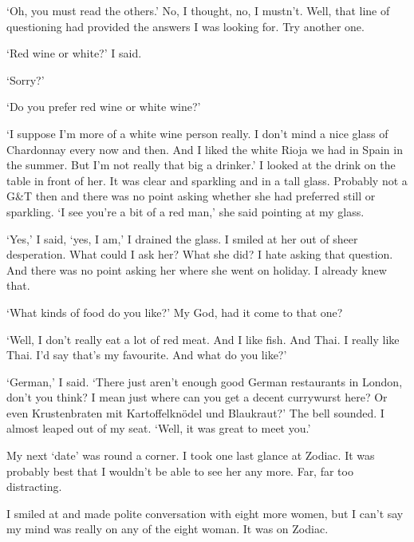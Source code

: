 `Oh, you must read the others.' No, I thought, no, I mustn't. Well,
that line of questioning had provided the answers I was looking for.
Try another one.

`Red wine or white?' I said.

`Sorry?'

`Do you prefer red wine or white wine?'

`I suppose I'm more of a white wine person really. I don't mind a
nice glass of Chardonnay every now and then. And I liked the white
Rioja we had in Spain in the summer. But I'm not really that big a
drinker.' I looked at the drink on the table in front of her. It was
clear and sparkling and in a tall glass. Probably not a G{\&}T then
and there was no point asking whether she had preferred still or
sparkling. `I see you're a bit of a red man,' she said pointing at
my glass.

`Yes,' I said, `yes, I am,' I drained the glass. I smiled at her out
of sheer desperation. What could I ask her? What she did? I hate
asking that question. And there was no point asking her where she
went on holiday. I already knew that.

`What kinds of food do you like?' My God, had it come to that one?

`Well, I don't really eat a lot of red meat. And I like fish. And
Thai. I really like Thai. I'd say that's my favourite. And what do
you like?'

`German,' I said. `There just aren't enough good German
restaurants in London, don't you think? I mean just where can you
get a decent currywurst here? Or even
{\twelveit Krustenbraten mit Kartoffelknödel und Blaukraut}?' The bell sounded. I almost leaped out of my seat.
`Well, it was great to meet you.'

My next `date' was round a corner. I took one last glance at Zodiac.
It was probably best that I wouldn't be able to see her any more.
Far, far too distracting.

I smiled at and made polite conversation with eight more women, but
I can't say my mind was really on any of the eight woman. It was on
Zodiac.

